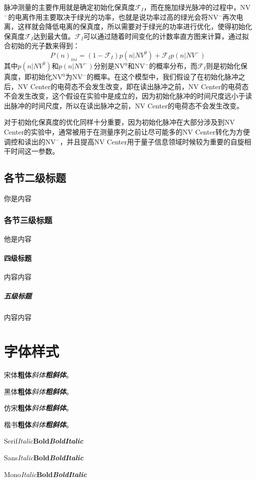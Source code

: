 \documentclass[type = bachelor]{whu-thesis}
\begin{document}
脉冲测量的主要作用就是确定初始化保真度$\mathcal{F}_I$，而在施加绿光脉冲的过程中，NV$^-$的电离作用主要取决于绿光的功率，也就是说功率过高的绿光会将NV$^-$再次电离，这样就会降低电离的保真度，所以需要对于绿光的功率进行优化，使得初始化保真度$\mathcal{F}_I$达到最大值。$\mathcal{F}_I$可以通过随着时间变化的计数率直方图来计算，通过拟合初始的光子数来得到：
\begin{equation}
  P(n)_{ini}=(1-\mathcal{F}_I)p(n|NV^0)+\mathcal{F}_Ip(n|NV^-)
\end{equation}
其中$p(n|NV^0)$和$p(n|NV^-)$分别是NV$^0$和NV$^-$的概率分布，而$\mathcal{F}_I$则是初始化保真度，即初始化NV$^0$为NV$^-$的概率。在这个模型中，我们假设了在初始化脉冲之后，NV Center的电荷态不会发生改变，即在读出脉冲之前，NV Center的电荷态不会发生改变，这个假设在实验中是成立的，因为初始化脉冲的时间尺度远小于读出脉冲的时间尺度，所以在读出脉冲之前，NV Center的电荷态不会发生改变。

对于初始化保真度的优化同样十分重要，因为初始化脉冲在大部分涉及到NV Center的实验中，通常被用于在测量序列之前让尽可能多的NV Center转化为方便调控和读出的NV$^-$，并且提高NV Center用于量子信息领域时候较为重要的自旋相干时间这一参数\cite{robledo2011spin}。

\subsection{各节二级标题}
你是内容

\subsubsection{各节三级标题}
他是内容

\paragraph{四级标题}
内容内容

\subparagraph{五级标题}
内容内容

\section{字体样式}
宋体\quad \textbf{粗体}\quad \textit{斜体}\quad \textbf{\textit{粗斜体}}。

{\heiti 黑体\quad \textbf{粗体}\quad \textit{斜体}\quad \textbf{\textit{粗斜体}}}。

{\fangsong 仿宋\quad \textbf{粗体}\quad \textit{斜体}\quad \textbf{\textit{粗斜体}}}。

{\kaishu 楷书\quad \textbf{粗体}\quad \textit{斜体}\quad \textbf{\textit{粗斜体}}}。

Serif\quad \textit{Italic}\quad \textbf{Bold}\quad \textbf{\textit{BoldItalic}}

{\sffamily Sans\quad \textit{Italic}\quad \textbf{Bold}\quad \textbf{\textit{BoldItalic}}}

{\ttfamily Mono\quad \textit{Italic}\quad \textbf{Bold}\quad \textbf{\textit{BoldItalic}}}
\end{document}
